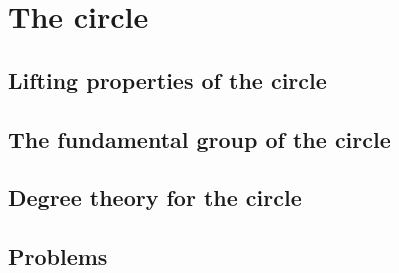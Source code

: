 \chapter{The circle}
\section{Lifting properties of the circle}
\section{The fundamental group of the circle}
\section{Degree theory for the circle}
\section{Problems}

